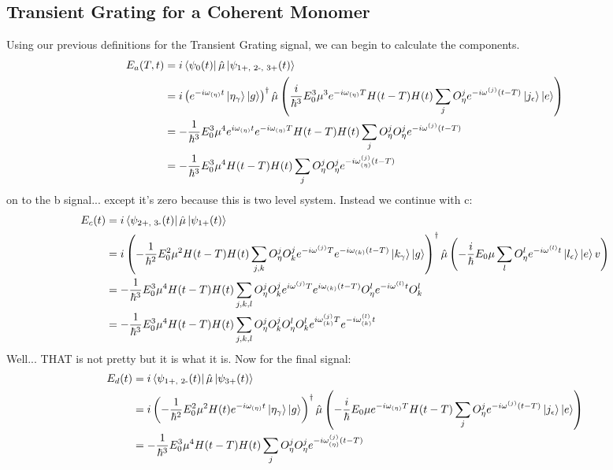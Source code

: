 \subsection{Transient Grating for a Coherent Monomer}
Using our previous definitions for the Transient Grating signal, we can begin to calculate the components.
\begin{align}
	E_a (T, t) &= i \bra{\psi_{0} (t)} \hat{\mu} \ket{\psi_{\text{1+, 2-, 3+}} (t)}\\
	&=  i \left( e^{-i \omega_{(\eta)}t} \ket{\eta_{\gamma}} \ket{g}   \right)^{\dagger} \hat{\mu} \left(  \frac{i}{\hbar^3} E^3_0 \mu^3 e^{-i \omega_{(\eta)}T} H(t-T)  H(t) \sum_{j}  O_{\eta}^{j}  e^{-i \omega^{(j)} (t - T) } \ket{j_{\epsilon}} \ket{e}  \right) \\
	&=  -\frac{1}{\hbar^3} E^3_0 \mu^4 e^{i \omega_{(\eta)}t}    e^{-i \omega_{(\eta)}T}   H(t-T) H(t)  \sum_{j}  O_{\eta}^{j} O_{\eta}^{j}  e^{-i \omega^{(j)} (t - T) } \\
	&=  -\frac{1}{\hbar^3} E^3_0 \mu^4  H(t-T)  H(t) \sum_{j}  O_{\eta}^{j} O_{\eta}^{j}  e^{-i \omega^{(j)}_{(\eta)} (t - T) }
\end{align}
on to the b signal... except it's zero because this is two level system.  Instead we continue with c:
\begin{align}
	E_c (t) &=  i \bra{\psi_{\text{2+, 3-}} (t)} \hat{\mu} \ket{\psi_{\text{1+}} (t)}\\
	&=  i \left(   -\frac{1}{\hbar^2} E^2_0 \mu^2 H(t-T) H(t)  \sum_{j, k} O_{\eta}^{j} O_{k}^{j} e^{-i \omega^{(j)} T } e^{-i \omega_{(k)} (t - T) } \ket{k_{\gamma}} \ket{g} \right)^{\dagger} \hat{\mu} \left( -\frac{i}{\hbar} E_0 \mu  \sum_{l} O_{\eta}^{l} e^{-i \omega^{(l)} t } \ket{l_{\epsilon}} \ket{e} v \right) \\
	&=  -\frac{1}{\hbar^3} E^3_0 \mu^4 H(t-T) H(t)  \sum_{j,k,l}O_{\eta}^{j} O_{k}^{j} e^{i \omega^{(j)} T } e^{i \omega_{(k)} (t - T) } O_{\eta}^{l} e^{-i \omega^{(l)} t } O_{k}^{l}\\
	&=  -\frac{1}{\hbar^3} E^3_0 \mu^4 H(t-T)  H(t) \sum_{j,k,l}O_{\eta}^{j} O_{k}^{j} O_{\eta}^{l} O_{k}^{l}  e^{i \omega^{(j)}_{(k)} T }  e^{-i \omega^{(l)}_{(k)} t }
\end{align}
Well... THAT is not pretty but it is what it is.  Now for the final signal:
\begin{align}
	E_d (t)&=  i \bra{\psi_{\text{1+, 2-}} (t)} \hat{\mu} \ket{\psi_{\text{3+}} (t)} \\
	&=  i \left( -\frac{1}{\hbar^2} E^2_0 \mu^2  H(t)  e^{-i \omega_{(\eta)}t}  \ket{\eta_{\gamma}} \ket{g}  \right)^{\dagger} \hat{\mu} \left(  -\frac{i}{\hbar} E_0 \mu  e^{-i \omega_{(\eta)}T} H(t-T) \sum_{j}  O_{\eta}^{j}  e^{-i \omega^{(j)} (t - T) } \ket{j_{\epsilon}} \ket{e} \right) \\
	&=  -\frac{1}{\hbar^3} E^3_0 \mu^4  H(t-T) H(t)  \sum_{j}  O_{\eta}^{j} O_{\eta}^{j}  e^{-i \omega^{(j)}_{(\eta)} (t - T) }
\end{align}




